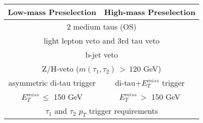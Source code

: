 %
\begin{tabular}{cc}
\hline 
\multicolumn{1}{c}{Low-mass Preselection} & High-mass Preselection \\ \hline \hline
\multicolumn{2}{c}{2 medium taus (OS)} \\
\multicolumn{2}{c}{light lepton veto and 3rd tau veto} \\
\multicolumn{2}{c}{b-jet veto} \\
\multicolumn{2}{c}{Z/H-veto ($m(\tau_1,\tau_2)\,>\,120$ GeV)} \\ 
\multicolumn{1}{c|}{asymmetric di-tau trigger} & di-tau+$E_T^{miss}$ trigger \\
\multicolumn{1}{c|}{$E_T^{miss}\,\leq$ 150 GeV} & $E_T^{miss}\,>$ 150 GeV \\
\multicolumn{2}{c}{$\tau_1$ and $\tau_2$ $p_T$ trigger requirements} \\ \hline 
\end{tabular}

%
%
